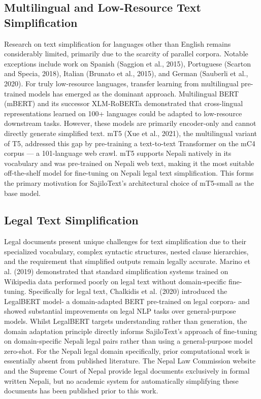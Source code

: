 \documentclass[12pt]{report}
\begin{document}
\subsection{Multilingual and Low-Resource Text Simplification}
Research on text simplification for languages other than English remains considerably limited, primarily due to the scarcity of parallel corpora. Notable exceptions include work on Spanish (Saggion et al., 2015), Portuguese (Scarton and Specia, 2018), Italian (Brunato et al., 2015), and German (Sauberli et al., 2020).
For truly low-resource languages, transfer learning from multilingual pre-trained models has emerged as the dominant approach. Multilingual BERT (mBERT) and its successor XLM-RoBERTa demonstrated that cross-lingual representations learned on 100+ languages could be adapted to low-resource downstream tasks. However, these models are primarily encoder-only and cannot directly generate simplified text.
mT5 (Xue et al., 2021), the multilingual variant of T5, addressed this gap by pre-training a text-to-text Transformer on the mC4 corpus — a 101-language web crawl. mT5 supports Nepali natively in its vocabulary and was pre-trained on Nepali web text, making it the most suitable off-the-shelf model for fine-tuning on Nepali legal text simplification. This forms the primary motivation for SajiloText's architectural choice of mT5-small as the base model.
\subsection{Legal Text Simplification}
Legal documents present unique challenges for text simplification due to their specialized vocabulary, complex syntactic structures, nested clause hierarchies, and the requirement that simplified outputs remain legally accurate. Marino et al. (2019) demonstrated that standard simplification systems trained on Wikipedia data performed poorly on legal text without domain-specific fine-tuning.
Specifically for legal text, Chalkidis et al. (2020) introduced the LegalBERT model- a domain-adapted BERT pre-trained on legal corpora- and showed substantial improvements on legal NLP tasks over general-purpose models. Whilst LegalBERT targets understanding rather than generation, the domain adaptation principle directly informs SajiloText's approach of fine-tuning on domain-specific Nepali legal pairs rather than using a general-purpose model zero-shot.
For the Nepali legal domain specifically, prior computational work is essentially absent from published literature. The Nepal Law Commission website and the Supreme Court of Nepal provide legal documents exclusively in formal written Nepali, but no academic system for automatically simplifying these documents has been published prior to this work.
\end{document}
